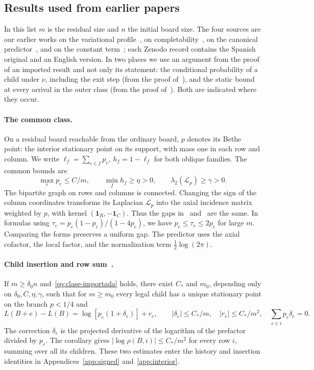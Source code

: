 \subsection{Results used from earlier papers}\label{sec:importados}
In this list \(m\) is the residual size and \(n\) the initial board size. The four sources are our
earlier works on the variational profile~\cite{pv}, on completability~\cite{ef}, on the canonical
predictor~\cite{pc}, and on the constant term~\cite{tc}; each Zenodo record contains the Spanish
original and an English version. In two places we use an argument from the proof of an imported
result and not only its statement: the conditional probability of a child under \(\nu\), including the
exit step (from the proof of~\cite[Thm.~8.1]{pc}), and the static bound at every arrival in the outer
class (from the proof of~\cite[Cor.~6.8]{tc}). Both are indicated where they occur.



\paragraph{The common class.} On a residual board reachable from the ordinary board, \(p\) denotes its
Bethe point: the interior stationary point on its support, with mass one in each row and column. We write
\(\ell_f=\sum_{e\in f}p_e\), \(h_f=1-\ell_f\) for both oblique families. The
common bounds are
\begin{equation}\label{eq:clase-importada}
 \max_e p_e\le C/m,\qquad \min_f h_f\ge\eta>0,\qquad
 \lambda_2(\mathcal L_p)\ge\gamma>0 .
\end{equation}
The bipartite graph on rows and columns is connected. Changing the sign of the column coordinates
transforms its Laplacian \(\mathcal L_p\) into the axial incidence matrix weighted by \(p\), with kernel
\((\mathbf1_R,-\mathbf1_C)\). Thus the gaps in~\cite{pc} and~\cite{tc} are the same. In formulas using
\(\tau_e=p_e(1-p_e)/(1-4p_e)\), we have \(p_e\le\tau_e\le2p_e\) for large \(m\). Comparing the forms
preserves a uniform gap. The predictor uses the axial cofactor, the local factor, and the normalization
term \(\tfrac12\log(2\pi)\).

\paragraph{Child insertion and row sum~\cite[Thm.~7.1 and Cor.~7.2]{pc}.} If \(m\ge\delta_0n\)
and~\eqref{eq:clase-importada} holds, there exist \(C_*\) and \(m_0\), depending only
on \(\delta_0,C,\eta,\gamma\), such that for \(m\ge m_0\) every legal child has a unique stationary point on
the branch \(p<1/4\) and
\[
 L(B+e)-L(B)=\log[p_e(1+\delta_e)]+r_e,\qquad
 |\delta_e|\le C_*/m,\quad |r_e|\le C_*/m^2,\quad \sum_{e\in i}p_e\delta_e=0 .
\]
The correction \(\delta_e\) is the projected derivative of the logarithm of the prefactor divided by
\(p_e\). The corollary gives \(|\log\rho(B,i)|\le C_*/m^2\) for every row \(i\), summing over all its
children. These two estimates enter the history and insertion identities in Appendices~\ref{app:signed}
and~\ref{app:interior}.

